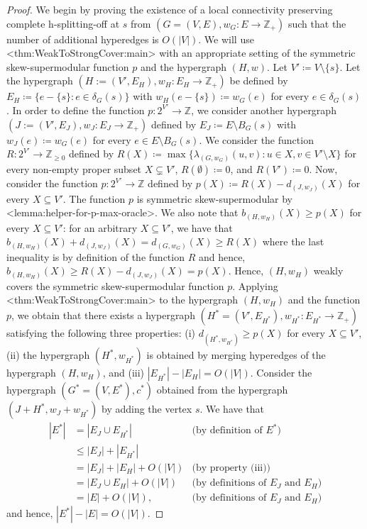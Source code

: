 \documentclass{article}
\def\Cref#1{<#1>}%
\newcommand{\knote}[1]{{\color{red}[{\tiny Karthik: \bf #1}]\marginpar{\color{red}*}}}
\providecommand{\Z}{\mathbb{Z}}
\begin{document}
\begin{proof}
    We begin by proving the existence of a local connectivity preserving complete h-splitting-off at $s$ from $(G=(V, E), w_G: E\rightarrow \Z_+)$ such that the number of additional hyperedges is $O(|V|)$. 
    We will use \Cref{thm:WeakToStrongCover:main} with an appropriate setting of the symmetric skew-supermodular function $p$ and the hypergraph $(H, w)$. 
    Let $V'\coloneqq V\setminus \{s\}$. 
    Let the hypergraph $(H:=(V', E_H), w_H: E_H\rightarrow \Z_+)$ be defined by $E_H\coloneqq \{e-\{s\}: e\in \delta_G(s)\}$ with $w_H(e-\{s\})\coloneqq w_G(e)$ for every $e\in \delta_G(s)$. 
    In order to define the function $p: 2^{V'}\rightarrow \Z$, we consider another hypergraph $(J:=({V'}, E_J), w_J: E_J\rightarrow \Z_+)$ defined by $E_J\coloneqq E\setminus B_G(s)$ with $w_J(e)\coloneqq w_G(e)$ for every $e\in E\setminus B_G(s)$. 
    We consider the function $R:2^{V'}\rightarrow \Z_{\ge 0}$ defined by $R(X)\coloneqq \max\{\lambda_{(G, w_G)}(u, v): u\in X, v\in V'\setminus X\}$ for every non-empty proper subset $X\subsetneq  V'$, $R(\emptyset)\coloneqq 0$, and $R(V')\coloneqq 0$. 
    Now, consider the function $p: 2^{V'}\rightarrow \Z$ defined by $p(X)\coloneqq R(X)-d_{(J, w_J)}(X)$ for every $X\subseteq {V'}$. 
    The function $p$ is symmetric skew-supermodular by \Cref{lemma:helper-for-p-max-oracle}. 
    We also note that $b_{(H, w_H)}(X)\ge p(X)$ for every $X\subseteq {V'}$: for an arbitrary $X\subseteq {V'}$, we have that $b_{(H, w_H)}(X)+d_{(J, w_J)}(X)=d_{(G, w_G)}(X)\ge R(X)$ where the last inequality is by definition of the function $R$ and hence, $b_{(H, w_H)}(X)\ge R(X)-d_{(J, w_J)}(X)=p(X)$. 
    Hence, $(H,w_H)$ weakly covers the symmetric skew-supermodular function $p$. 
    Applying \Cref{thm:WeakToStrongCover:main} to the hypergraph $(H, w_H)$ and the function $p$, we obtain that there exists a hypergraph $(H^* = (V', E_{H^*}), w_{H^*}: E_{H^*}\rightarrow \Z_+)$ satisfying the following three properties: (i) $d_{(H^*, w_{H^*})}\ge p(X)$ for every $X\subseteq V'$,  (ii) the hypergraph $(H^*, w_{H^*})$ is obtained by merging hyperedges of the hypergraph $(H, w_H)$, and (iii) $|E_{H^*}|-|E_H|=O(|V|)$. 
    Consider the hypergraph $(G^*=(V, E^*), c^*)$ obtained from the hypergraph $(J+H^*, w_J+w_{H^*})$ by adding the vertex $s$. 
    We have that 
    \begin{align*}
    |E^*|
    &=|E_J\cup E_{H^*}| &\text{(by definition of $E^*$)}\\
    &\le |E_J|+|E_{H^*}| &\\
    &=|E_J|+|E_H|+O(|V|) & \text{(by property (iii))}\\
    &=|E_J\cup E_H|+O(|V|) & \text{(by definitions of $E_J$ and $E_H$)}\\
    &=|E|+O(|V|), & \text{(by definitions of $E_J$ and $E_H$)}
    \end{align*}
    and hence, $|E^*|-|E|=O(|V|)$. 
    

\end{proof}
\end{document}
